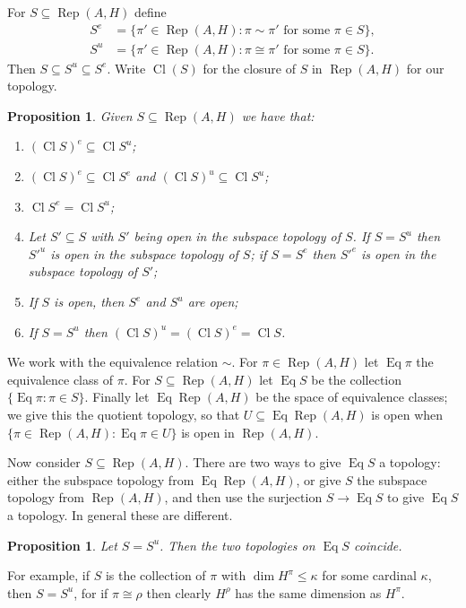 \documentclass[a4paper,11pt]{article}
\newcommand{\Rep}{\operatorname{Rep}}
\newcommand{\Cl}{\operatorname{Cl}}
\newcommand{\Eq}{\operatorname{Eq}}
\newtheorem{proposition}[lemma]{Proposition}
\begin{document}
For $S \subseteq \Rep(A,H)$ define
\begin{align*}
S^e &= \{ \pi'\in\Rep(A,H) : \pi\sim\pi' \text{ for some } \pi\in S \}, \\
S^u &= \{ \pi'\in\Rep(A,H) : \pi\cong\pi' \text{ for some } \pi\in S \}.
\end{align*}
Then $S \subseteq S^u \subseteq S^e$.  Write $\Cl(S)$ for the closure of
$S$ in $\Rep(A,H)$ for our topology.

\begin{proposition}\label{prop:fell_top_props}
Given $S\subseteq\Rep(A,H)$ we have that:
\begin{enumerate}
\item $(\Cl S)^e \subseteq \Cl S^u$;
\item $(\Cl S)^e \subseteq \Cl S^e$ and $(\Cl S)^u \subseteq \Cl S^u$;
\item $\Cl S^e = \Cl S^u$;
\item Let $S' \subseteq S$ with $S'$ being open in the subspace topology
of $S$.  If $S=S^u$ then ${S'}^u$ is open in the subspace topology of $S$;
if $S=S^e$ then ${S'}^e$ is open in the subspace topology of $S'$;
\item\label{prop:fell_top_props:one}
 If $S$ is open, then $S^e$ and $S^u$ are open;
\item If $S = S^u$ then $(\Cl S)^u = (\Cl S)^e = \Cl S$.
\end{enumerate}
\end{proposition}

We work with the equivalence relation $\sim$.  For $\pi\in\Rep(A,H)$ let
$\Eq\pi$ the equivalence class of $\pi$.  For $S\subseteq\Rep(A,H)$ let
$\Eq S$ be the collection $\{\Eq\pi : \pi \in S\}$.  Finally let $\Eq\Rep(A,H)$
be the space of equivalence classes; we give this the quotient topology, so
that $U\subseteq \Eq\Rep(A,H)$ is open when $\{\pi\in\Rep(A,H):\Eq\pi\in U\}$
is open in $\Rep(A,H)$.

Now consider $S\subseteq \Rep(A,H)$.  There are two ways to give $\Eq S$ a
topology: either the subspace topology from $\Eq\Rep(A,H)$, or give $S$ the
subspace topology from $\Rep(A,H)$, and then use the surjection $S\rightarrow
\Eq S$ to give $\Eq S$ a topology.  In general these are different.

\begin{proposition}\label{prop:uni_equiv_im_unique}
Let $S=S^u$.  Then the two topologies on $\Eq S$ coincide.
\end{proposition}

For example, if $S$ is the collection of $\pi$ with $\dim H^\pi \leq \kappa$
for some cardinal $\kappa$, then $S=S^u$, for if $\pi\cong\rho$ then clearly
$H^\rho$ has the same dimension as $H^\pi$.
\end{document}
